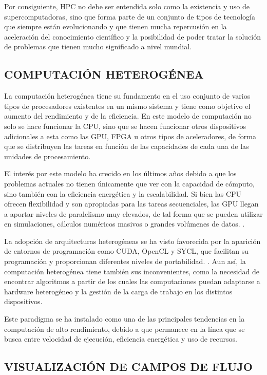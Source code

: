 \documentclass[12pt]{article}
\begin{document}
Por consiguiente, HPC no debe ser entendida solo como la existencia y uso de supercomputadoras, sino que forma parte de un conjunto de tipos de tecnología que siempre están evolucionando y que tienen mucha repercusión en la aceleración del conocimiento científico y la posibilidad de poder tratar la solución de problemas que tienen mucho significado a nivel mundial.


\subsection{COMPUTACIÓN HETEROGÉNEA}

La computación heterogénea tiene su fundamento en el uso conjunto de varios tipos de procesadores existentes en un mismo sistema y tiene como objetivo el aumento del rendimiento y de la eficiencia. En este modelo de computación no solo se hace funcionar la CPU, sino que se hacen funcionar otros dispositivos adicionales a esta como las GPU, FPGA u otros tipos de aceleradores, de forma que se distribuyen las tareas en función de las capacidades de cada una de las unidades de procesamiento.

El interés por este modelo ha crecido en los últimos años debido a que los problemas actuales no tienen únicamente que ver con la capacidad de cómputo, sino también con la eficiencia energética y la escalabilidad. Si bien las CPU ofrecen flexibilidad y son apropiadas para las tareas secuenciales, las GPU llegan a aportar niveles de paralelismo muy elevados, de tal forma que se pueden utilizar en simulaciones, cálculos numéricos masivos o grandes volúmenes de datos. \cite{mittal_survey_2015}.

La adopción de arquitecturas heterogéneas se ha visto favorecida por la aparición de entornos de programación como CUDA, OpenCL y SYCL, que facilitan su programación y proporcionan diferentes niveles de portabilidad. \cite{keryell_sycl_2019}. Aun así, la computación heterogénea tiene también sus inconvenientes, como la necesidad de encontrar algoritmos a partir de los cuales las computaciones puedan adaptarse a hardware heterogéneo y la gestión de la carga de trabajo en los distintos dispositivos.

Este paradigma se ha instalado como una de las principales tendencias en la computación de alto rendimiento, debido a que permanece en la línea que se busca entre velocidad de ejecución, eficiencia energética y uso de recursos.

\subsection{VISUALIZACIÓN DE CAMPOS DE FLUJO}
\end{document}
